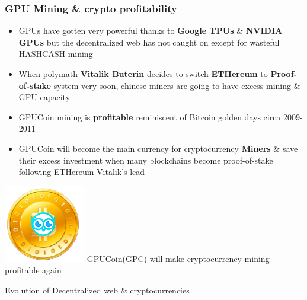 \documentclass[10pt,handout]{beamer}
\begin{document}
\begin{frame}[t]\frametitle{GPU Mining \& crypto profitability}
\begin{itemize}[<+-| alert@+>]
\item GPUs have gotten very powerful thanks to \textbf{Google TPUs} \& \textbf{NVIDIA GPUs} but the decentralized web has not caught on except for wasteful HASHCASH mining
\item When polymath \textbf{Vitalik Buterin} decides to switch \textbf{ETHereum} to \textbf{Proof-of-stake} system very soon, chinese miners are going to have excess mining \& GPU capacity
\item GPUCoin mining is \textbf{profitable} reminiscent of Bitcoin golden days circa 2009-2011
\item GPUCoin will become the main currency for cryptocurrency \textbf{Miners} \& save their excess investment when many blockchains become proof-of-stake following ETHereum Vitalik's lead
\end{itemize}
 \pause
 \includegraphics[scale=0.1]{static/hootcoin} 
\Large{ GPUCoin(GPC) will make cryptocurrency mining profitable again}

\end{frame}

\begin{frame}[t]{Evolution of Decentralized web \& cryptocurrencies}
 
\end{frame} 
\end{document}
